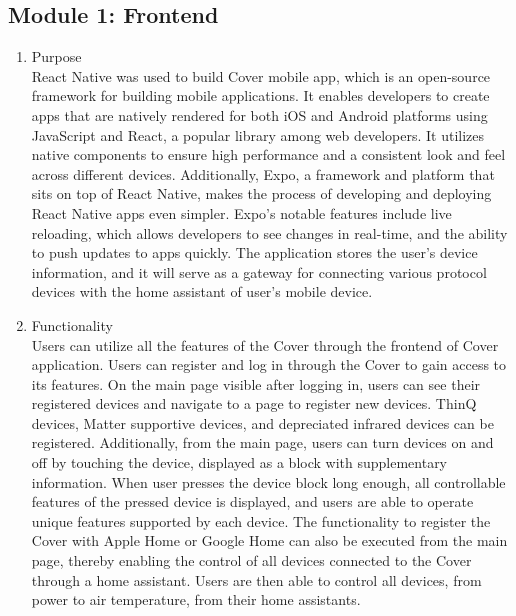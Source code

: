 \documentclass[conference]{IEEEtran}
\begin{document}
\subsection{\large{Module 1: Frontend}}
\begin{enumerate}[label=\arabic*.]
\item Purpose\\
React Native was used to build Cover mobile app, which is an open-source framework for building mobile applications. It enables developers to create apps that are natively rendered for both iOS and Android platforms using JavaScript and React, a popular library among web developers. It utilizes native components to ensure high performance and a consistent look and feel across different devices. Additionally, Expo, a framework and platform that sits on top of React Native, makes the process of developing and deploying React Native apps even simpler. Expo's notable features include live reloading, which allows developers to see changes in real-time, and the ability to push updates to apps quickly. The application stores the user's device information, and it will serve as a gateway for connecting various protocol devices with the home assistant of user's mobile device. \\

\item Functionality\\
Users can utilize all the features of the Cover through the frontend of Cover application. Users can register and log in through the Cover to gain access to its features. On the main page visible after logging in, users can see their registered devices and navigate to a page to register new devices. ThinQ devices, Matter supportive devices, and depreciated infrared devices can be registered. Additionally, from the main page, users can turn devices on and off by touching the device, displayed as a block with supplementary information. When user presses the device block long enough, all controllable features of the pressed device is displayed, and users are able to operate unique features supported by each device. The functionality to register the Cover with Apple Home or Google Home can also be executed from the main page, thereby enabling the control of all devices connected to the Cover through a home assistant. Users are then able to control all devices, from power to air temperature, from their home assistants.\\


\end{enumerate}
\end{document}
